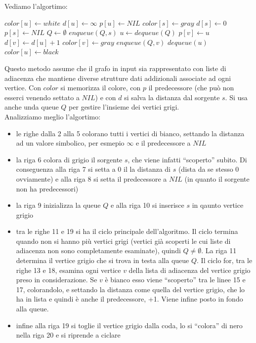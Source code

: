 \documentclass[a4paper,12pt, oneside]{book}
\begin{document}
Vediamo l'algortimo:
\begin{algorithm}
  \begin{algorithmic}[1]
    \State $color[u]\gets white$
    \State $d[u]\gets \infty$
    \State $p[u]\gets NIL$
    \EndFor
    \State $color[s]\gets gray$
    \State $d[s]\gets 0$
    \State $p[s]\gets NIL$
    \State $Q\gets \emptyset$
    \State $enqueue(Q,s)$
    \State $u\gets dequeue(Q)$
    \State $p[v]\gets u$
    \State $d[v]\gets d[u]+1$
    \State $color[v]\gets gray$
    \State $enqueue(Q,v)$
    \EndIf
    \EndFor
    \State $dequeue(u)$
    \State $color[u]\gets black$ 
    \EndWhile
    \EndFunction
  \end{algorithmic}
\end{algorithm}
Questo metodo assume che il grafo in input sia rappresentato con liste
di adiacenza che mantiene diverse strutture dati addizionali associate
ad ogni vertice. Con $color$ si memorizza il colore, con $p$ il
predecessore (che può non esserci venendo settato a $NIL$) e con $d$
si salva la distanza dal sorgente $s$. Si usa anche unda queue $Q$ per
gestire l'insieme dei vertici grigi.\\
Analizziamo meglio l'algortimo:
\begin{itemize}
  \item le righe dalla 2 alla 5 colorano tutti i vertici di bianco,
  settando la distanza ad un valore simbolico, per esmepio $\infty$ e
  il predecessore a $NIL$
  \item la riga 6 colora di grigio il sorgente $s$, che viene infatti
  ``scoperto'' subito. Di conseguenza alla riga 7 si setta a 0 il
  la distanza di $s$ (dista da se stesso 0 ovviamente) e alla riga 8
  si setta il predecessore a $NIL$ (in quanto il sorgente non ha
  predecessori)
  \item la riga 9 inizializza la queue $Q$ e alla riga 10 si inserisce
  $s$ in qaunto vertice grigio
  \item tra le righe 11 e 19 si ha il ciclo principale
  dell'algoritmo. Il ciclo termina quando non si hanno più vertici
  grigi (vertici già scoperti le cui liste di adiacenza non sono
  completamente esaminate), quindi $Q\neq \emptyset$. La riga 11
  determina il vertice grigio che   si trova in testa alla queue
  $Q$. Il ciclo for, tra le righe 13 e   18, esamina ogni vertice $v$
  della lista di adiacenza del vertice grigio   preso in
  considerazione. Se $v$ è bianco esso viene ``scoperto'' tra   le
  linee 15 e 17, colorandolo, e settando la distanza come quella   del
  vertice grigio, che lo ha in lista e quindi è anche il
  predecessore, +1. Viene infine posto in fondo alla queue.
  \item infine alla riga 19 si toglie il vertice grigio dalla coda, lo
  si ``colora'' di nero nella riga 20 e si riprende a ciclare
\end{itemize}
\end{document}
